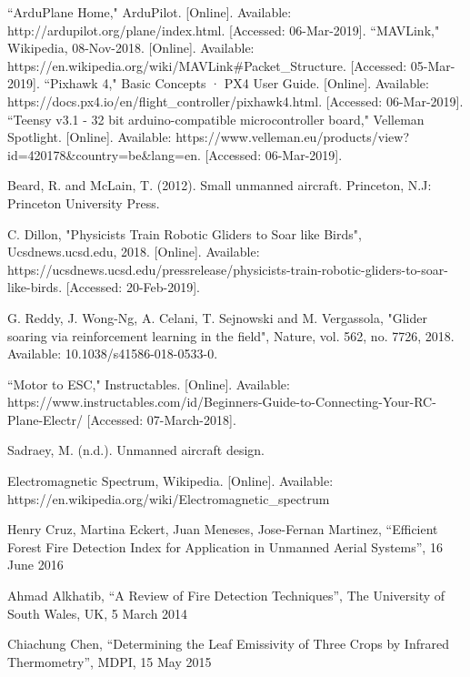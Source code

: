 \documentclass[12pt,journal,compsoc]{IEEEtran}
\begin{document}
\begin{thebibliography}{2}
``ArduPlane Home," ArduPilot. [Online]. Available: http://ardupilot.org/plane/index.html. [Accessed: 06-Mar-2019].
``MAVLink," Wikipedia, 08-Nov-2018. [Online]. Available: https://en.wikipedia.org/wiki/MAVLink\#Packet\_Structure. [Accessed: 05-Mar-2019].
``Pixhawk 4," Basic Concepts · PX4 User Guide. [Online]. Available: https://docs.px4.io/en/flight\_controller/pixhawk4.html. [Accessed: 06-Mar-2019].
``Teensy v3.1 - 32 bit arduino-compatible microcontroller board," Velleman Spotlight. [Online]. Available: https://www.velleman.eu/products/view?id=420178\&country=be\&lang=en. [Accessed: 06-Mar-2019].

Beard, R. and McLain, T. (2012). Small unmanned aircraft. Princeton, N.J: Princeton University Press.

C. Dillon, "Physicists Train Robotic Gliders to Soar like Birds", Ucsdnews.ucsd.edu, 2018. [Online]. Available: https://ucsdnews.ucsd.edu/pressrelease/physicists-train-robotic-gliders-to-soar-like-birds. [Accessed: 20-Feb-2019].

G. Reddy, J. Wong-Ng, A. Celani, T. Sejnowski and M. Vergassola, "Glider soaring via reinforcement learning in the field", Nature, vol. 562, no. 7726, 2018. Available: 10.1038/s41586-018-0533-0.

``Motor to ESC," Instructables. [Online]. Available: https://www.instructables.com/id/Beginners-Guide-to-Connecting-Your-RC-Plane-Electr/ [Accessed: 07-March-2018].

Sadraey, M. (n.d.). Unmanned aircraft design.

Electromagnetic Spectrum, Wikipedia. [Online]. Available: 
https://en.wikipedia.org/wiki/Electromagnetic\_spectrum

Henry Cruz, Martina Eckert, Juan Meneses, Jose-Fernan Martinez, “Efficient Forest Fire Detection Index for Application in Unmanned Aerial Systems”, 16 June 2016

Ahmad Alkhatib, “A Review of Fire Detection Techniques”, The University of South Wales, UK, 5 March 2014

Chiachung Chen, “Determining the Leaf Emissivity of Three Crops by Infrared Thermometry”, MDPI, 15 May 2015


\end{thebibliography}
\end{document}
